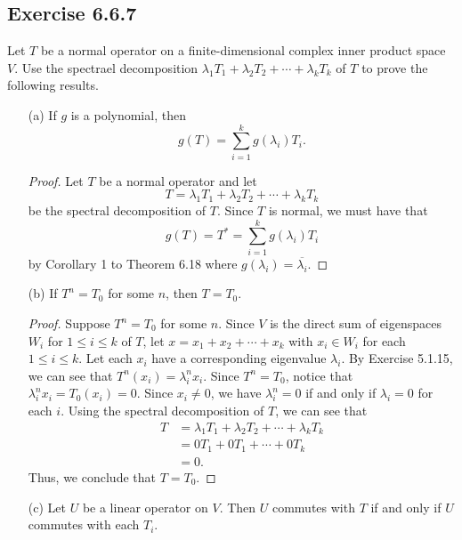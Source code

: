 \subsection*{Exercise 6.6.7} Let \( T  \) be a normal operator on a finite-dimensional complex inner product space \( V  \). Use the spectrael decomposition \( {\lambda}_{1} {T}_{1} + {\lambda}_{2} {T}_{2} + \cdots + {\lambda}_{k} {T}_{k} \) of \( T  \) to prove the following results.
\begin{enumerate}
    \item[(a)] If \( g \) is a polynomial, then 
        \[  g(T) = \sum_{ i=1  }^{ k  } g({\lambda}_{i}) {T}_{i}. \]
        \begin{proof}
        Let \( T  \) be a normal operator and let 
        \[  T= {\lambda}_{1} {T}_{1} + {\lambda}_{2} {T}_{2} + \cdots + {\lambda}_{k} {T}_{k} \]
        be the spectral decomposition of \( T  \). Since \( T  \) is normal, we must have that
        \[  g(T) = T^{*} = \sum_{ i=1  }^{ k } g({\lambda}_{i}) {T}_{i}  \]
        by Corollary 1 to Theorem 6.18 where \( g({\lambda}_{i}) = \overline{{\lambda}_{i}} \).
        \end{proof}
    \item[(b)] If \( T^{n} = {T}_{0} \) for some \( n  \), then \( T = {T}_{0} \). 
        \begin{proof}
        Suppose \( T^{n} = {T}_{0} \) for some \( n \). Since \( V  \) is the direct sum of eigenspaces \( {W}_{i} \) for \( 1 \leq i \leq k \) of \( T \), let \( x = {x}_{1} + {x}_{2} + \cdots + {x}_{k} \) with \( {x}_{i} \in {W}_{i} \) for each \( 1 \leq i \leq k \). Let each \( {x}_{i} \) have a corresponding eigenvalue \( {\lambda}_{i} \). By Exercise 5.1.15, we can see that \( T^{n}({x}_{i}) = {\lambda}_{i}^{n} {x}_{i}  \). Since \( T^{n} = {T}_{0} \), notice that \( {\lambda}_{i}^{n} {x}_{i} = {T}_{0}({x}_{i}) = 0  \). Since \( {x}_{i} \neq 0  \), we have \( {\lambda}_{i}^{n} = 0    \) if and only if \( {\lambda}_{i} = 0  \) for each \( i  \). Using the spectral decomposition of \( T  \), we can see that
        \begin{align*}
            T &= {\lambda}_{1} {T}_{1} + {\lambda}_{2} {T}_{2}  + \cdots + {\lambda}_{k} {T}_{k}  \\
              &= 0 {T}_{1} + 0{T}_{1} + \cdots  + 0 {T}_{k} \\
              &= 0.
        \end{align*}
        Thus, we conclude that \( T = {T}_{0} \).
\end{proof}
    \item[(c)] Let \( U  \) be a linear operator on \( V  \). Then \( U  \) commutes with \( T  \) if and only if \( U  \) commutes with each \( {T}_{i} \). 

\end{enumerate}
